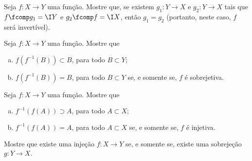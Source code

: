 \begin{challenge}
    Seja $f: X \to Y$ uma função. Mostre que, se existem $g_1 : Y
\to X$ e $g_2 : Y \to X$ tais que $f \fcomp g_1 = \I Y$ e $g_2 \fcomp
f = \I X$, então $g_1 = g_2$ (portanto, neste caso, $f$ será
invertível).
\end{challenge}

\begin{challenge}
    Seja $f: X \to Y$ uma função. Mostre que
\begin{enumerate}[(a)]
  \item $f(f^{-1}(B)) \subset B$, para todo $B \subset Y$;
  \item $f(f^{-1}(B)) = B$, para todo $B \subset Y$ se, e
  somente se, $f$ é sobrejetiva.
\end{enumerate}
\end{challenge}

\begin{challenge}
    Seja $f: X \to Y$ uma função. Mostre que
\begin{enumerate}[(a)]
  \item $f^{-1}(f(A)) \supset A$, para todo $A \subset X$;
  \item $f^{-1}(f(A)) = A$, para todo $A \subset X$ se, e
  somente se, $f$ é injetiva.
\end{enumerate}
\end{challenge}

\begin{challenge}
    Mostre que existe uma injeção $f: X \to Y$ se, e somente se,
existe uma sobrejeção $g: Y \to X$.
\end{challenge}


